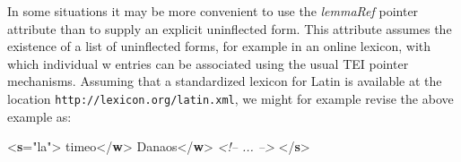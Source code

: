 In some situations it may be more convenient to use the {\itshape lemmaRef} pointer attribute than to supply an explicit uninflected form. This attribute assumes the existence of a list of uninflected forms, for example in an online lexicon, with which individual w entries can be associated using the usual TEI pointer mechanisms. Assuming that a standardized lexicon for Latin is available at the location \texttt{http://lexicon.org/latin.xml}, we might for example revise the above example as: \par\bgroup{}\exampleFont \begin{shaded}\noindent\mbox{}{<\textbf{s}\hspace*{1em}{xml:lang}="{la}">}\mbox{}\newline 
{}timeo{</\textbf{w}>}\mbox{}\newline 
{}Danaos{</\textbf{w}>}\mbox{}\newline 
\textit{<!-- ... -->}\mbox{}\newline 
{</\textbf{s}>}\end{shaded}\egroup\par 

